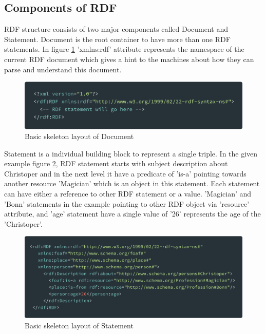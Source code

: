 	\subsection{Components of RDF}
	
		RDF structure consists of two major components called Document and Statement. Document is the root container to have more than one RDF statements. In figure \ref{fig:rdf_document} 'xmlns:rdf' attribute represents the namespace of the current RDF document which gives a hint to the machines about how they can parse and understand this document.
		\begin{figure}[!htbp] 
			\begin{center}
				\includegraphics[scale=0.1]{./images/png/rdf/document}	
				\caption{Basic skeleton layout of Document}	
				\label{fig:rdf_document}	
			\end{center}
		\end{figure}
		
		Statement is a individual building block to represent a single triple. In the given example figure \ref{fig:rdf_statement}, RDF statement starts with subject description about Christoper and in the next level it have a predicate of 'is-a' pointing towards another resource 'Magician' which is an object in this statement. Each statement can have either a reference to other RDF statement or a value. 'Magician' and 'Bonn' statements in the example pointing to other RDF object via 'resource' attribute, and 'age' statement have a single value of '26' represents the age of the 'Christoper'.
		
		\begin{figure}[!htbp] 
			\begin{center}
				\includegraphics[scale=0.1]{./images/png/rdf/statement}	
				\caption{Basic skeleton layout of Statement}	
				\label{fig:rdf_statement}	
			\end{center}
		\end{figure}
	
